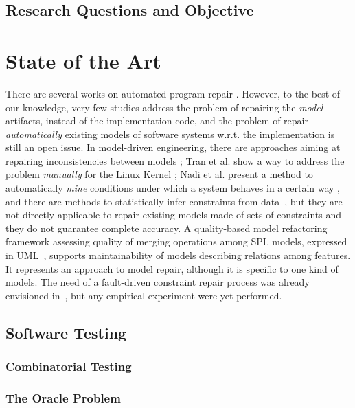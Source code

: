 \documentclass[
11pt, %
oneside, %
english, %
singlespacing, %
headsepline, %
]{MastersDoctoralThesis} %
\theoremstyle{plain}
\theoremstyle{definition}
\theoremstyle{remark}
\theoremstyle{remark}
\theoremstyle{plain}
\theoremstyle{plain}
\begin{document}
\section{Research Questions and Objective}



\chapter{State of the Art}
There are several works on automated program repair \cite{nguyen_semfix:_2013,le_goues_systematic_2012,ARCURI20113494}. However, to the best of our knowledge, very few studies address the problem of repairing the \textit{model} artifacts, instead of the implementation code, and the problem of repair \textit{automatically} existing models of software systems w.r.t. the implementation is still an open issue. 
In model-driven engineering, there are approaches aiming at repairing inconsistencies between models \cite{Macedo:2013:MRT:3107656.3107752}; Tran et al. show a way to address the problem \textit{manually} for the Linux Kernel \cite{Tran:1999:FRR:781995.782007}; Nadi et al. present a method to automatically \textit{mine} conditions under which a system behaves in a certain way \cite{NadiBKC14}, and there are methods to statistically infer constraints from data~\cite{chiang_unified_2011,abukwaik_extracting_2016}, but they are not directly applicable to repair existing models made of sets of constraints and they do not guarantee complete accuracy. 
A quality-based model refactoring framework assessing quality of merging operations among SPL models, expressed in UML~\cite{rubin_quality_2013}, supports maintainability of models describing relations among features. It represents an approach to model repair, although it is specific to one kind of models.
The need of a fault-driven constraint repair process was already envisioned in~\cite{henard_towards_2013}, but any empirical experiment were yet performed.

\section{Software Testing}
\subsection{Combinatorial Testing}
\subsection{The Oracle Problem}
\end{document}
